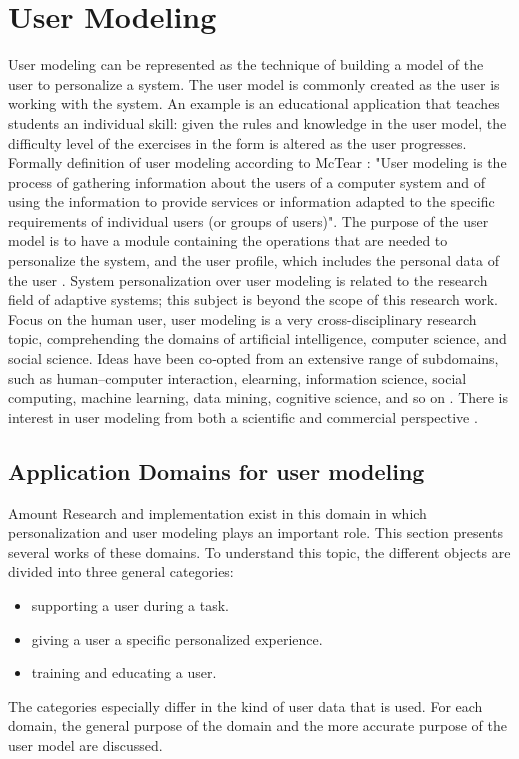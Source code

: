 \section{User Modeling}



User modeling can be represented as the technique of building a model of the
user to personalize a system. The user model is commonly created as the user is
working with the system. An example is an educational application that teaches
students an individual skill: given the rules and knowledge in the user model,
the difficulty level of the exercises in the form is altered as the user
progresses. Formally definition of user modeling according to McTear
\cite{mctear1993user}: "User modeling is the process of gathering information
about the users of a computer system and of using the information to provide
services or information adapted to the specific requirements of individual users
(or groups of users)". The purpose of the user model is to have a module
containing the operations that are needed to personalize the system, and the
user profile, which includes the personal data of the user
\cite{fischer2001user}. System personalization over user modeling is related
to the research field of adaptive systems; this subject is beyond the scope of
this research work. Focus on the human user, user modeling is a very
cross-disciplinary research topic, comprehending the domains of artificial
intelligence, computer science, and social science. Ideas have been co‐opted
from an extensive range of subdomains, such as human–computer interaction,
e\textendash learning, information science, social computing, machine learning, data
mining, cognitive science, and so on \cite{kay2012coming}
\cite{kobsa2001generic}. There is interest in user modeling from both a
scientific and commercial perspective \cite{razmerita2009user}.
\subsection{Application Domains for user modeling}

Amount Research and implementation exist in this domain in which personalization
and user modeling plays an important role. This section presents several works
of these domains. To understand this topic, the different objects are divided
into three general categories:
\begin{itemize}
	\item {supporting a user during a task. }
	\item {giving a user a specific personalized experience. }
	\item {training and educating a user.}
\end{itemize}
The categories especially differ in the kind of user data that is used. For each
domain, the general purpose of the domain and the more accurate purpose of the
user model are discussed.

